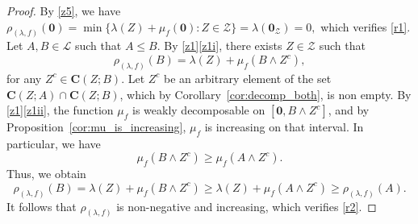 \documentclass[a4paper,11pt,reqno]{article}
\theoremstyle{definition}
\newcommand{\zero}{{\mathbf{0}}}
\begin{document}
\begin{proof}
    By \ref{z5}, we have
    \(
        \rho_{(\lambda,f)}(\zero) = \min\{\lambda(Z) + \mu_f(\zero) : Z \in \mathcal{Z} \} = \lambda(\zero_{\mathcal{Z}}) = 0,
    \)
    which verifies \ref{r1}.
    Let $A, B \in \mathcal{L}$ such that $A\leq B$. By \ref{z1}\ref{z1i}, there exists $Z \in \mathcal{Z}$ such that 
    \[
        \rho_{(\lambda,f)}(B) = \lambda(Z) + \mu_f(B \wedge Z^c),
    \] 
    for any $Z^c \in \mathbf{C}(Z;B)$. Let $Z^c$ be an arbitrary element of the set $\mathbf{C}(Z;A)\cap\mathbf{C}(Z;B)$, which by Corollary~\ref{cor:decomp_both}, is non empty. By \ref{z1}\ref{z1ii}, the function $\mu_f$ is weakly decomposable on $[\zero, B \wedge Z^c]$, and by Proposition~\ref{cor:mu_is_increasing}, $\mu_f$ is increasing on that interval. In particular, we have 
    \[
        \mu_f(B \wedge Z^c) \geq \mu_f(A \wedge Z^c).
    \] 
    Thus, we obtain  
    \[
        \rho_{(\lambda,f)}(B) = \lambda(Z) + \mu_f(B \wedge Z^c) \geq \lambda(Z) + \mu_f(A \wedge Z^c) \geq \rho_{(\lambda,f)}(A).
    \] 
    It follows that $\rho_{(\lambda,f)}$ is non-negative and increasing, which verifies \ref{r2}.
    

\end{proof}
\end{document}
